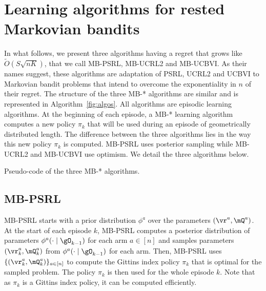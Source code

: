 \section{Learning algorithms for rested Markovian bandits}
\label{sec:learning_algorithms}
In what follows, we present three algorithms having a regret that grows like $\tilde{O}(S\sqrt{nK})$, that we call MB-PSRL, MB-UCRL2 and MB-UCBVI. As their names suggest, these algorithms are adaptation of PSRL, UCRL2 and UCBVI to Markovian bandit problems that intend to overcome the exponentiality in $n$ of their regret. The structure of the three MB-* algorithms are similar and is represented in Algorithm~\ref{fig:algos}. All algorithms are episodic learning algorithms. At the beginning of each episode, a MB-* learning algorithm computes a new policy $\pi_k$ that will be used during an episode of geometrically distributed length. The difference between the three algorithms lies in the way this new policy $\pi_k$ is computed. MB-PSRL uses posterior sampling while MB-UCRL2 and MB-UCBVI use optimism. We detail the three algorithms below. 

\begin{algorithm}[ht]
    \BlankLine
    \caption{Pseudo-code of the three MB-* algorithms.}
    \label{fig:algos}
\end{algorithm}

\subsection{MB-PSRL}
MB-PSRL starts with a prior distribution \(\phi^{a}\) over the parameters \((\vr^a,\mQ^a)\). At the start of each episode $k$, MB-PSRL computes
a posterior distribution of parameters \(\phi^a(\cdot \mid\gO_{k-1})\) for
each arm $a\in[n]$ and samples parameters \((\vr_k^a,\mQ_k^a)\) from
\(\phi^a(\cdot \mid\gO_{k-1})\) for each arm. Then, MB-PSRL uses \(\{(\vr_k^a,\mQ_k^a)\}_{a\in[n]}\)
to compute the Gittins index policy $\pi_k$ that is optimal for the sampled
problem.  The policy \(\pi_k\)  is then used for the whole episode \(k\). Note that as $\pi_k$ is a Gittins index policy, it can be computed efficiently. 

